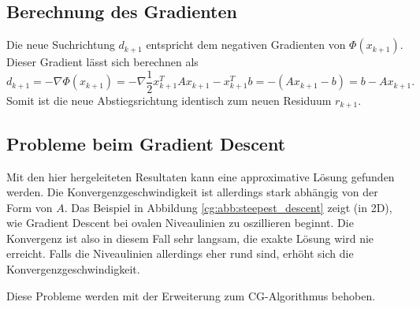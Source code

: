 \subsection{Berechnung des Gradienten}
Die neue Suchrichtung $d_{k+1}$ entspricht dem negativen Gradienten von $\Phi(x_{k+1})$.
Dieser Gradient lässt sich berechnen als
\begin{equation}
	d_{k+1} = - \nabla \Phi(x_{k+1}) = - \nabla \frac{1}{2} x_{k+1}^T A x_{k+1} - x_{k+1}^T b = -(Ax_{k+1} - b) = b - Ax_{k+1}.
\end{equation}
Somit ist die neue Abstiegsrichtung identisch zum neuen Residuum $r_{k+1}$.

\subsection{Probleme beim Gradient Descent}
Mit den hier hergeleiteten Resultaten kann eine approximative Lösung gefunden werden.
Die Konvergenzgeschwindigkeit ist allerdings stark abhängig von der Form von $A$.
Das Beispiel in Abbildung \ref{cg:abb:steepest_descent} zeigt (in 2D), wie Gradient Descent bei ovalen Niveaulinien zu oszillieren beginnt.
Die Konvergenz ist also in diesem Fall sehr langsam, die exakte Lösung wird nie erreicht.
Falls die Niveaulinien allerdings eher rund sind, erhöht sich die Konvergenzgeschwindigkeit.

Diese Probleme werden mit der Erweiterung zum CG-Algorithmus behoben.
